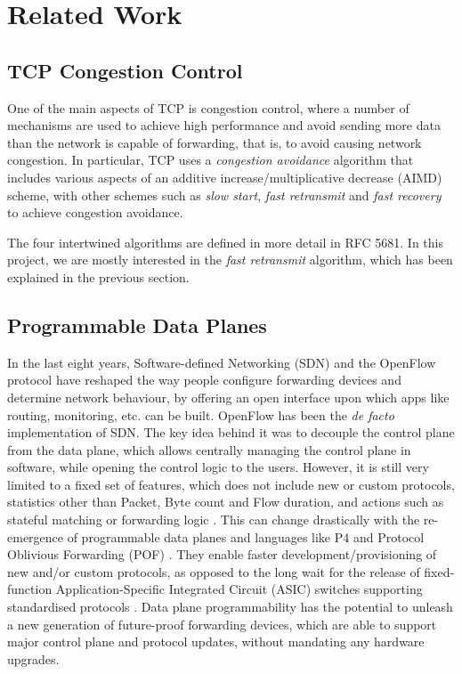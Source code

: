 \section{Related Work}
	\subsection{TCP Congestion Control}
	One of the main aspects of TCP is congestion control, where a number of mechanisms are used to achieve high performance and avoid sending more data than the network is capable of forwarding, that is, to avoid causing network congestion. In particular, TCP uses a \textit{congestion avoidance} algorithm that includes various aspects of an additive increase/multiplicative decrease (AIMD) scheme, with other schemes such as \textit{slow start}, \textit{fast retransmit} and \textit{fast recovery} to achieve congestion avoidance. 
	
	The four intertwined algorithms are defined in more detail in RFC 5681\cite{rfc5681}. In this project, we are mostly interested in the \textit{fast retransmit} algorithm, which has been explained in the previous section.
	
	\subsection{Programmable Data Planes}
	In the last eight years, Software-defined Networking (SDN) and the OpenFlow protocol have reshaped the way people configure forwarding devices and determine network behaviour, by offering an open interface upon which apps like routing, monitoring, etc. can be built. OpenFlow has been the \textit{de facto} implementation of SDN. The key idea behind it was to decouple the control plane from the data plane, which allows centrally managing the control plane in software, while opening the control logic to the users. However, it is still very limited to a fixed set of features, which does not include new or custom protocols, statistics other than Packet, Byte count and Flow duration, and actions such as stateful matching or forwarding logic \cite{sdn}. This can change drastically with the re-emergence of programmable data planes and languages like P4 \cite{bosshart2014p4, p4spec, p4.org} and Protocol Oblivious Forwarding (POF) \cite{pof, song2013protocol}. They enable faster development/provisioning of new and/or custom protocols, as opposed to the long wait for the release of fixed-function Application-Specific Integrated Circuit (ASIC) switches supporting standardised protocols \cite{sivaraman2015dc}. Data plane programmability has the potential to unleash a new generation of future-proof forwarding devices, which are able to support major control plane and protocol updates, without mandating any hardware upgrades.

